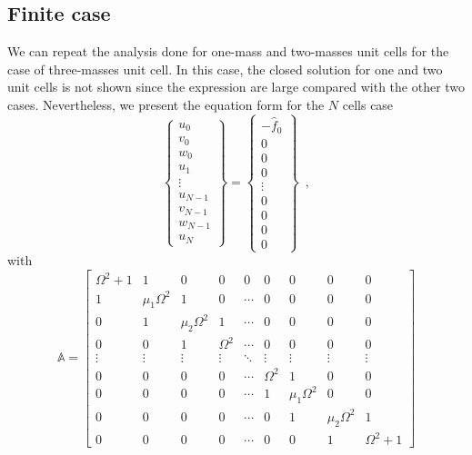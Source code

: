 \documentclass[12pt]{article}
\begin{document}
\subsection{Finite case}
We can repeat the analysis done for one-mass and two-masses unit cells for the case of three-masses unit cell. In this case, the closed solution for one and two unit cells is not shown since the expression are large compared with the other two cases. Nevertheless, we present the equation form for the $N$ cells case
\begin{equation}
  [\mathbb{A} - 2\mathbb{I}]\begin{Bmatrix}
  u_0 \\ 
  v_0 \\ 
  w_0 \\ 
  u_1 \\ 
  \vdots \\ 
  u_{N-1} \\ 
  v_{N-1} \\ 
  w_{N-1} \\ 
  u_N
  \end{Bmatrix} = 
  \begin{Bmatrix}
  -\hat{f}_0 \\ 
  0 \\ 
  0 \\ 
  0 \\ 
  \vdots \\ 
  0 \\ 
  0 \\ 
  0 \\ 
  0
\end{Bmatrix} \enspace ,
\end{equation}
with
\[\mathbb{A} = \begin{bmatrix}
 \Omega^2 + 1 & 1 & 0 & 0 & 0 & 0 & 0 & 0 & 0 \\ 
 1 & \mu_1\Omega^2 & 1 & 0 & \cdots & 0 & 0 & 0 & 0 \\ 
 0 & 1 & \mu_2\Omega^2 & 1 & \cdots & 0 & 0 & 0 & 0 \\ 
 0 & 0 & 1 & \Omega^2 & \cdots & 0 & 0 & 0 & 0 \\ 
 \vdots & \vdots & \vdots & \vdots & \ddots & \vdots & \vdots & \vdots & \vdots \\ 
 0 & 0 & 0 & 0 & \cdots & \Omega^2 & 1 & 0 & 0 \\ 
 0 & 0 & 0 & 0 & \cdots & 1 & \mu_1\Omega^2 & 0 & 0 \\ 
 0 & 0 & 0 & 0 & \cdots & 0 & 1 & \mu_2\Omega^2 & 1 \\ 
 0 & 0 & 0 & 0 & \cdots & 0 & 0 & 1 & \Omega^2 + 1
 \end{bmatrix}\]
 
\end{document}
